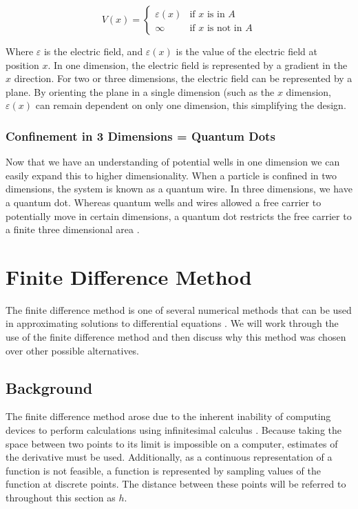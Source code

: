 \documentclass[authoryearcitations]{UoYCSproject}
\begin{document}
\begin{equation}
V(x) = \begin{cases}
          \varepsilon (x) & \text{if $x$ is in $A$}  \\
          \infty    & \text{if $x$ is not in $A$} 
         \end{cases}
\label{vx2}
\end{equation}

Where $\varepsilon$ is the electric field, and $\varepsilon (x)$ is the value of the electric field at position
$x$. In one dimension, the electric field is represented by a gradient in the $x$ direction. For two or
three dimensions, the electric field can be represented by a plane. By orienting the plane in a single 
dimension (such as the $x$ dimension, $\varepsilon (x)$ can remain dependent on only one dimension, this simplifying
the design. 

\subsubsection{Confinement in 3 Dimensions = Quantum Dots}
Now that we have an understanding of potential wells in one dimension we can easily expand this to higher
dimensionality. When a particle is confined in two dimensions, the system is known as a quantum wire. In three 
dimensions, we have a quantum dot. Whereas quantum wells and wires allowed a free carrier to potentially move in 
certain dimensions, a quantum dot restricts the free carrier to a finite three dimensional area \cite{dots}. 


\section{Finite Difference Method}
The finite difference method is one of several numerical methods that can be used in approximating
solutions to differential equations \cite{Hamming}. We will work through the use of the finite 
difference method and then discuss why this method was chosen over other possible alternatives. 

\subsection{Background}
The finite difference method arose due to the inherent inability of computing devices to perform
calculations using infinitesimal calculus \cite{Hamming, zhilin}. Because taking the space
between two points to its limit is impossible on a computer, estimates of the derivative must be
used. Additionally, as a continuous representation of a function is not feasible, a function is represented
by sampling values of the function at discrete points. The distance between these points will
be referred to throughout this section as $h$. 
\end{document}
